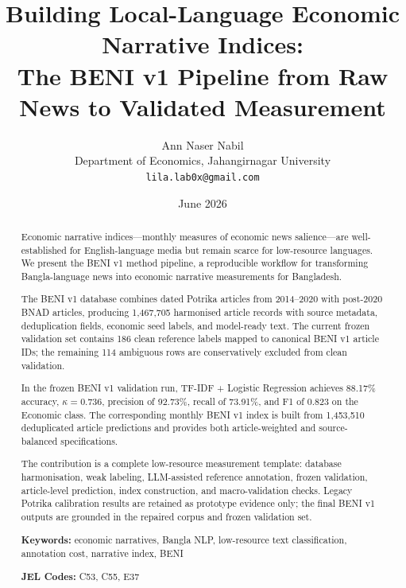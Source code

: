 \documentclass[11pt]{article}
\title{Building Local-Language Economic Narrative Indices: \\
The BENI v1 Pipeline from Raw News to Validated Measurement}
\author{Ann Naser Nabil \\
Department of Economics, Jahangirnagar University \\
\texttt{lila.lab0x@gmail.com}}
\date{June 2026}
\begin{document}
\maketitle

\begin{abstract}
Economic narrative indices---monthly measures of economic news salience---are well-established for English-language media but remain scarce for low-resource languages. We present the BENI v1 method pipeline, a reproducible workflow for transforming Bangla-language news into economic narrative measurements for Bangladesh.

The BENI v1 database combines dated Potrika articles from 2014--2020 with post-2020 BNAD articles, producing 1,467,705 harmonised article records with source metadata, deduplication fields, economic seed labels, and model-ready text. The current frozen validation set contains 186 clean reference labels mapped to canonical BENI v1 article IDs; the remaining 114 ambiguous rows are conservatively excluded from clean validation.

In the frozen BENI v1 validation run, TF-IDF + Logistic Regression achieves 88.17\% accuracy, $\kappa = 0.736$, precision of 92.73\%, recall of 73.91\%, and F1 of 0.823 on the Economic class. The corresponding monthly BENI v1 index is built from 1,453,510 deduplicated article predictions and provides both article-weighted and source-balanced specifications.

The contribution is a complete low-resource measurement template: database harmonisation, weak labeling, LLM-assisted reference annotation, frozen validation, article-level prediction, index construction, and macro-validation checks. Legacy Potrika calibration results are retained as prototype evidence only; the final BENI v1 outputs are grounded in the repaired corpus and frozen validation set.

\textbf{Keywords:} economic narratives, Bangla NLP, low-resource text classification, annotation cost, narrative index, BENI

\textbf{JEL Codes:} C53, C55, E37
\end{abstract}












\end{document}
